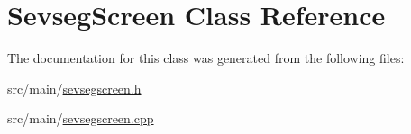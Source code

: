 \hypertarget{class_sevseg_screen}{}\section{Sevseg\+Screen Class Reference}
\label{class_sevseg_screen}


The documentation for this class was generated from the following files\+:\begin{DoxyCompactItemize}
\item 
src/main/\hyperlink{sevsegscreen_8h}{sevsegscreen.\+h}\item 
src/main/\hyperlink{sevsegscreen_8cpp}{sevsegscreen.\+cpp}\end{DoxyCompactItemize}
